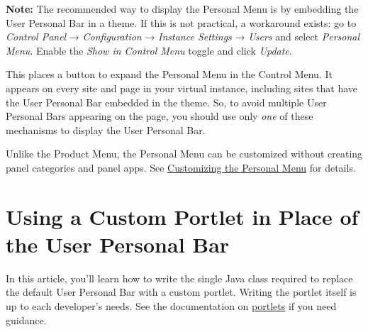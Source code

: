 \noindent\hrulefill

\textbf{Note:} The recommended way to display the Personal Menu is by
embedding the User Personal Bar in a theme. If this is not practical, a
workaround exists: go to \emph{Control Panel} → \emph{Configuration} →
\emph{Instance Settings} → \emph{Users} and select \emph{Personal Menu}.
Enable the \emph{Show in Control Menu} toggle and click \emph{Update}.

This places a button to expand the Personal Menu in the Control Menu. It
appears on every site and page in your virtual instance, including sites
that have the User Personal Bar embedded in the theme. So, to avoid
multiple User Personal Bars appearing on the page, you should use only
\emph{one} of these mechanisms to display the User Personal Bar.

\noindent\hrulefill

Unlike the Product Menu, the Personal Menu can be customized without
creating panel categories and panel apps. See
\href{/docs/7-2/customization/-/knowledge_base/c/customizing-the-personal-menu}{Customizing
the Personal Menu} for details.

\chapter{Using a Custom Portlet in Place of the User Personal
Bar}\label{using-a-custom-portlet-in-place-of-the-user-personal-bar}

In this article, you'll learn how to write the single Java class
required to replace the default User Personal Bar with a custom portlet.
Writing the portlet itself is up to each developer's needs. See the
documentation on
\href{/docs/7-2/frameworks/-/knowledge_base/f/portlets}{portlets} if you
need guidance.

